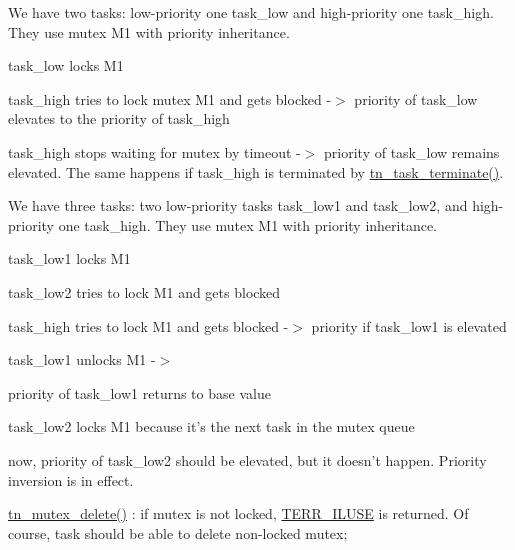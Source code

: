 \begin{DoxyItemize}
\item We have two tasks\+: low-\/priority one {\ttfamily task\+\_\+low} and high-\/priority one {\ttfamily task\+\_\+high}. They use mutex {\ttfamily M1} with priority inheritance.
\begin{DoxyItemize}
\item {\ttfamily task\+\_\+low} locks {\ttfamily M1}
\item {\ttfamily task\+\_\+high} tries to lock mutex {\ttfamily M1} and gets blocked -\/$>$ priority of {\ttfamily task\+\_\+low} elevates to the priority of {\ttfamily task\+\_\+high}
\item {\ttfamily task\+\_\+high} stops waiting for mutex by timeout -\/$>$ priority of {\ttfamily task\+\_\+low} remains elevated. The same happens if {\ttfamily task\+\_\+high} is terminated by {\ttfamily \hyperlink{tn__tasks_8h_a8ae6615de7022a327bdcd4c37a0f5b90}{tn\+\_\+task\+\_\+terminate()}}.
\end{DoxyItemize}
\item We have three tasks\+: two low-\/priority tasks {\ttfamily task\+\_\+low1} and {\ttfamily task\+\_\+low2}, and high-\/priority one {\ttfamily task\+\_\+high}. They use mutex {\ttfamily M1} with priority inheritance.
\begin{DoxyItemize}
\item {\ttfamily task\+\_\+low1} locks {\ttfamily M1}
\item {\ttfamily task\+\_\+low2} tries to lock {\ttfamily M1} and gets blocked
\item {\ttfamily task\+\_\+high} tries to lock {\ttfamily M1} and gets blocked -\/$>$ priority if {\ttfamily task\+\_\+low1} is elevated
\item {\ttfamily task\+\_\+low1} unlocks {\ttfamily M1} -\/$>$
\begin{DoxyItemize}
\item priority of {\ttfamily task\+\_\+low1} returns to base value
\item {\ttfamily task\+\_\+low2} locks {\ttfamily M1} because it's the next task in the mutex queue
\item now, priority of {\ttfamily task\+\_\+low2} should be elevated, but it doesn't happen. Priority inversion is in effect.
\end{DoxyItemize}
\end{DoxyItemize}
\item {\ttfamily \hyperlink{tn__mutex_8h_a9c935ae470f1d36f8d88c254a4d513e4}{tn\+\_\+mutex\+\_\+delete()}} \+: if mutex is not locked, {\ttfamily \hyperlink{tn__oldsymbols_8h_acc6afb7d5fab73e262e8cb4f9fd06ac4}{T\+E\+R\+R\+\_\+\+I\+L\+U\+S\+E}} is returned. Of course, task should be able to delete non-\/locked mutex;

\end{DoxyItemize}
